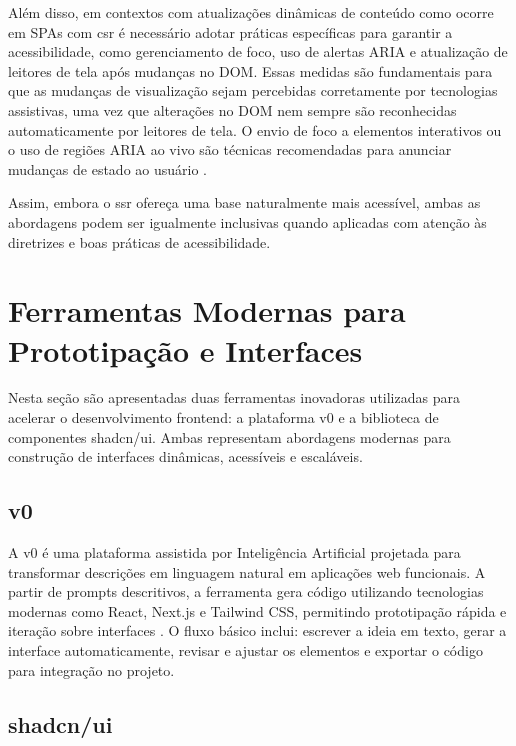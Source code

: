 Além disso, em contextos com atualizações dinâmicas de conteúdo como ocorre em SPAs com \acrshort{csr} é necessário adotar práticas específicas para garantir a acessibilidade, como gerenciamento de foco, uso de alertas ARIA e atualização de leitores de tela após mudanças no DOM. Essas medidas são fundamentais para que as mudanças de visualização sejam percebidas corretamente por tecnologias assistivas, uma vez que alterações no DOM nem sempre são reconhecidas automaticamente por leitores de tela. O envio de foco a elementos interativos ou o uso de regiões ARIA ao vivo são técnicas recomendadas para anunciar mudanças de estado ao usuário \cite{sutton2018}.

Assim, embora o \acrshort{ssr} ofereça uma base naturalmente mais acessível, ambas as abordagens podem ser igualmente inclusivas quando aplicadas com atenção às diretrizes e boas práticas de acessibilidade.



\section{Ferramentas Modernas para Prototipação e Interfaces}
\label{sec:ferramentas-modernas}

Nesta seção são apresentadas duas ferramentas inovadoras utilizadas para acelerar o desenvolvimento frontend: a plataforma v0 e a biblioteca de componentes shadcn/ui. Ambas representam abordagens modernas para construção de interfaces dinâmicas, acessíveis e escaláveis.

\subsection{v0}
\label{subsec:v0}

A v0 é uma plataforma assistida por Inteligência Artificial projetada para transformar descrições em linguagem natural em aplicações web funcionais. A partir de prompts descritivos, a ferramenta gera código utilizando tecnologias modernas como React, Next.js e Tailwind CSS, permitindo prototipação rápida e iteração sobre interfaces \cite{v0_docs}. O fluxo básico inclui: escrever a ideia em texto, gerar a interface automaticamente, revisar e ajustar os elementos e exportar o código para integração no projeto.

\subsection{shadcn/ui}
\label{subsec:shadcn}

